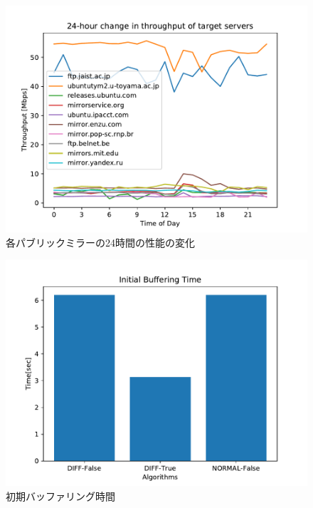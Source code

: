 \documentclass[a4j,12pt]{gradthesis_utf8}
\begin{document}
\begin{figure}[h]
    \begin{center}
        \includegraphics[width=12cm]{thp24h.pdf}
        \caption{各パブリックミラーの24時間の性能の変化}
        \label{24h}
    \end{center}
\end{figure}

\newpage

\begin{figure}[h]
	\begin{center}
		\includegraphics[width=15cm]{InitialBufferingTimePubIBRC.pdf}
		\caption{初期バッファリング時間}
		\label{ibtpub}
	\end{center}
\end{figure}
\end{document}
